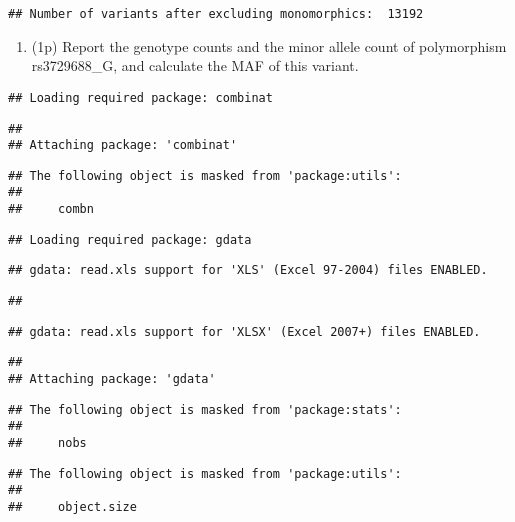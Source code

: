 \documentclass[
]{article}
\providecommand{\tightlist}{%
  \setlength{\itemsep}{0pt}\setlength{\parskip}{0pt}}
\begin{document}
\begin{verbatim}
## Number of variants after excluding monomorphics:  13192
\end{verbatim}

\begin{enumerate}
\def\labelenumi{\arabic{enumi}.}
\setcounter{enumi}{4}
\tightlist
\item
  (1p) Report the genotype counts and the minor allele count of
  polymorphism rs3729688\_G, and calculate the MAF of this variant.
\end{enumerate}

\begin{verbatim}
## Loading required package: combinat
\end{verbatim}

\begin{verbatim}
## 
## Attaching package: 'combinat'
\end{verbatim}

\begin{verbatim}
## The following object is masked from 'package:utils':
## 
##     combn
\end{verbatim}

\begin{verbatim}
## Loading required package: gdata
\end{verbatim}

\begin{verbatim}
## gdata: read.xls support for 'XLS' (Excel 97-2004) files ENABLED.
\end{verbatim}

\begin{verbatim}
## 
\end{verbatim}

\begin{verbatim}
## gdata: read.xls support for 'XLSX' (Excel 2007+) files ENABLED.
\end{verbatim}

\begin{verbatim}
## 
## Attaching package: 'gdata'
\end{verbatim}

\begin{verbatim}
## The following object is masked from 'package:stats':
## 
##     nobs
\end{verbatim}

\begin{verbatim}
## The following object is masked from 'package:utils':
## 
##     object.size
\end{verbatim}
\end{document}
